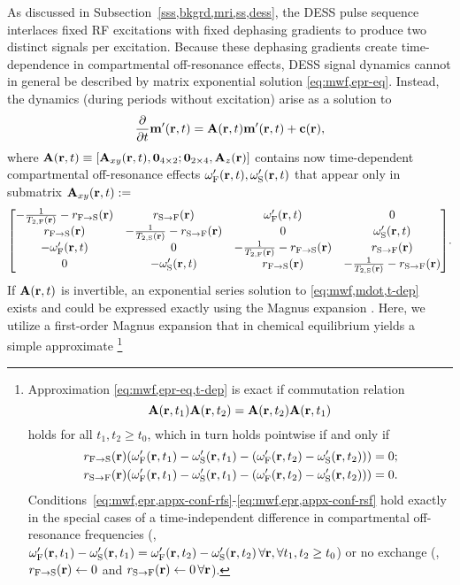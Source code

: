 As discussed
in Subsection~\ref{sss,bkgrd,mri,ss,dess},
the DESS pulse sequence interlaces fixed RF excitations
with fixed dephasing gradients
to produce two distinct signals
per excitation.
Because these dephasing gradients
create time-dependence
in compartmental off-resonance effects,
DESS signal dynamics
cannot in general be described
by matrix exponential solution \eqref{eq:mwf,epr-eq}.
Instead, 
the dynamics (during periods without excitation) 
arise as a solution to
\begin{align}
	\dela{t} \bmmp\prt = \bmA\prt \bmmp\prt + \bmc\pr,
	\label{eq:mwf,mdot,t-dep}
\end{align}
where
$\bmA\prt \equiv \brac{\bmAxy\prt, \zeros{4 \times 2};
\zeros{2 \times 4}, \bmAz\pr}$
contains now time-dependent compartmental off-resonance effects
$\ompf\prt, \omps\prt$
that appear only in submatrix
$\bmAxy\prt :=$
\begin{align}
	\begin{bmatrix}
		-\frac{1}{\tf{2}\pr}-\rfs\pr & \rsf\pr & \ompf\prt & 0 \\
		\rfs\pr & -\frac{1}{\ts{2}\pr}-\rsf\pr & 0 & \omps\prt \\
		-\ompf\prt & 0 & -\frac{1}{\tf{2}\pr}-\rfs\pr & \rsf\pr \\
		0 & -\omps\prt & \rfs\pr & -\frac{1}{\ts{2}\pr}-\rsf\pr
	\end{bmatrix}.
	\label{eq:mwf,Axy-t-dep}
\end{align}
If $\bmA\prt$ is invertible,
an exponential series solution
to \eqref{eq:mwf,mdot,t-dep} exists
and could be expressed exactly
using the Magnus expansion \cite{magnus:54:ote}. 
Here, 
we utilize a first-order Magnus expansion 
that in chemical equilibrium yields
a simple approximate 
\footnote{%
	Approximation \eqref{eq:mwf,epr-eq,t-dep} is exact 
	if commutation relation
	$$\bmA\paren{\bmr,t_1}\bmA\paren{\bmr,t_2} = \bmA\paren{\bmr,t_2} \bmA\paren{\bmr,t_1}$$
	holds for all $t_1,t_2 \geq t_0$,
	which in turn holds pointwise if and only if
	\begin{align}
  	\rfs\pr \paren{\ompf\paren{\bmr,t_1} - \omps\paren{\bmr,t_1} -
  		\paren{\ompf\paren{\bmr,t_2} - \omps\paren{\bmr,t_2}}} &= 0;
  		\label{eq:mwf,epr,appx-conf-rfs} \\
  	\rsf\pr \paren{\ompf\paren{\bmr,t_1} - \omps\paren{\bmr,t_1} -
  		\paren{\ompf\paren{\bmr,t_2} - \omps\paren{\bmr,t_2}}} &= 0.
  		\label{eq:mwf,epr,appx-conf-rsf}
  \end{align}
  Conditions~\eqref{eq:mwf,epr,appx-conf-rfs}-\eqref{eq:mwf,epr,appx-conf-rsf} hold exactly
  in the special cases 
  of a time-independent difference 
  in compartmental off-resonance frequencies
  (\ie, $\ompf\paren{\bmr,t_1} - \omps\paren{\bmr,t_1} =
  	\ompf\paren{\bmr,t_2} - \omps\paren{\bmr,t_2}\, 
		\forall \bmr, \forall t_1,t_2 \geq t_0$)
  or no exchange 
  (\ie, $\rfs\pr \gets 0$ and $\rsf\pr  \gets 0\,
  	\forall \bmr$).
}
